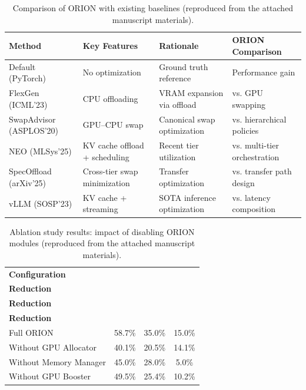 
\begin{table}[t]
\centering
\renewcommand{\arraystretch}{1.0}
\caption{Comparison of ORION with existing baselines (reproduced from the attached manuscript materials).}
\label{tab:baseline_comparison}
\begin{tabular}{|p{3.5cm}|p{3cm}|p{3.5cm}|p{3.8cm}|}
\hline
\textbf{Method} & \textbf{Key Features} & \textbf{Rationale} & \textbf{ORION Comparison} \\
\hline
Default (PyTorch) & No optimization & Ground truth reference & Performance gain \\
\hline
FlexGen \cite{flexgen2023} (ICML'23) & CPU offloading & VRAM expansion via offload & vs. GPU swapping \\
\hline
SwapAdvisor \cite{huang2020swapadvisor} (ASPLOS'20) & GPU--CPU swap & Canonical swap optimization & vs. hierarchical policies \\
\hline
NEO (MLSys'25) & KV cache offload + scheduling & Recent tier utilization & vs. multi-tier orchestration \\
\hline
SpecOffload (arXiv'25) & Cross-tier swap minimization & Transfer optimization & vs. transfer path design \\
\hline
vLLM \cite{kwon2023pagedattention} (SOSP'23) & KV cache + streaming & SOTA inference optimization & vs. latency composition \\
\hline
\end{tabular}
\end{table}

\begin{table}[t]
\centering
\renewcommand{\arraystretch}{1.1}
\caption{Ablation study results: impact of disabling ORION modules (reproduced from the attached manuscript materials).}
\label{tab:ablation}
\begin{tabular}{|l|c|c|c|}
\hline
\textbf{Configuration} &
\makecell{\textbf{Load Time} \\ \textbf{Reduction}} &
\makecell{\textbf{Latency} \\ \textbf{Reduction}} &
\makecell{\textbf{VRAM} \\ \textbf{Reduction}} \\
\hline
Full ORION             & 58.7\% & 35.0\% & 15.0\% \\
Without GPU Allocator  & 40.1\% & 20.5\% & 14.1\% \\
Without Memory Manager & 45.0\% & 28.0\% & 5.0\%  \\
Without GPU Booster    & 49.5\% & 25.4\% & 10.2\% \\
\hline
\end{tabular}
\end{table}

